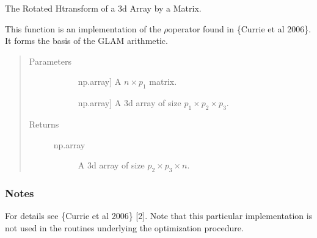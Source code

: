 \documentclass[letterpaper,10pt,english]{sphinxmanual}
\begin{document}
\begin{fulllineitems}
\label{\detokenize{pysmme:pysmme.transforms.H}}
\end{fulllineitems}


\begin{fulllineitems}
\label{\detokenize{pysmme:pysmme.transforms.RH}}
\sphinxAtStartPar
The Rotated H\sphinxhyphen{}transform of a 3d Array by a Matrix.

\sphinxAtStartPar
This function is an implementation of the \(\rho\)\sphinxhyphen{}operator found in
\{Currie et al 2006\}. It forms the basis of the GLAM arithmetic.
\begin{quote}\begin{description}
\item[{Parameters}] \leavevmode\begin{description}
\item[{}] \leavevmode{[}np.array{]}
\sphinxAtStartPar
A \({n \times p_1}\) matrix.

\item[{}] \leavevmode{[}np.array{]}
\sphinxAtStartPar
A 3d array of size \(p_1 \times p_2 \times p_3\).

\end{description}

\item[{Returns}] \leavevmode\begin{description}
\item[{np.array}] \leavevmode
\sphinxAtStartPar
A 3d array of size \(p_2 \times p_3 \times n\).

\end{description}

\end{description}\end{quote}
\subsubsection*{Notes}

\sphinxAtStartPar
For details see \{Currie et al 2006\} {[}2{]}. Note that this particular implementation
is not used in the  routines underlying the optimization procedure.

\end{fulllineitems}
\end{document}
